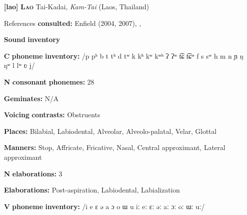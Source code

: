 \documentclass[output=paper]{langsci/langscibook}
\begin{document}
\begin{styleBody}
\textbf{[lao]}   \textbf{\textsc{Lao}}  Tai-Kadai, \textit{Kam-Tai} (Laos, Thailand)
\end{styleBody}

\begin{styleBody}
References \textbf{consulted:} Enfield (2004, 2007), \citet{Erickson2001}, \citet{MorevEtAl1979}
\end{styleBody}

\begin{styleBody}
\textbf{Sound} \textbf{inventory}
\end{styleBody}

\begin{styleBody}
\textbf{C} \textbf{phoneme} \textbf{inventory:} /p pʰ b t tʰ d tʷ k kʰ kʷ kʷʰ ʔ ʔʷ t͡ɕ t͡ɕʷ f s sʷ h m n ɲ ŋ ŋʷ l lʷ ʋ j/
\end{styleBody}

\begin{styleBody}
\textbf{N} \textbf{consonant} \textbf{phonemes:} 28
\end{styleBody}

\begin{styleBody}
\textbf{Geminates:} N/A
\end{styleBody}

\begin{styleBody}
\textbf{Voicing} \textbf{contrasts:} Obstruents
\end{styleBody}

\begin{styleBody}
\textbf{Places:} Bilabial, Labiodental, Alveolar, Alveolo-palatal, Velar, Glottal
\end{styleBody}

\begin{styleBody}
\textbf{Manners:} Stop, Affricate, Fricative, Nasal, Central approximant, Lateral approximant
\end{styleBody}

\begin{styleBody}
\textbf{N} \textbf{elaborations:} 3
\end{styleBody}

\begin{styleBody}
\textbf{Elaborations:} Post-aspiration, Labiodental, Labialization
\end{styleBody}

\begin{styleBody}
\textbf{V} \textbf{phoneme} \textbf{inventory:} /i e ɛ ə a ɔ o ɯ u iː eː ɛː əː aː ɔː oː ɯː uː/
\end{styleBody}
\end{document}
